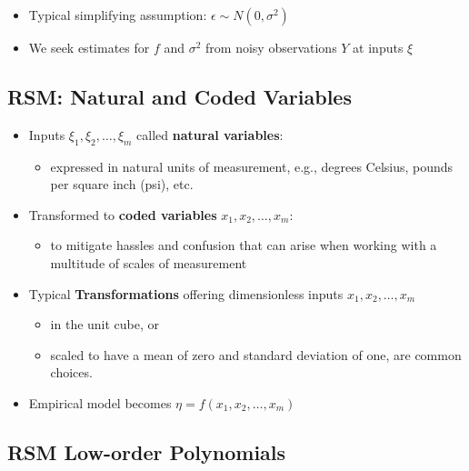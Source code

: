 \documentclass[
  letterpaper,
  DIV=11,
  numbers=noendperiod]{scrreprt}
\providecommand{\tightlist}{%
  \setlength{\itemsep}{0pt}\setlength{\parskip}{0pt}}\usepackage{longtable,booktabs,array}
\begin{document}
\begin{itemize}
\tightlist
\item
  Typical simplifying assumption: \(\epsilon \sim N(0,\sigma^2)\)
\item
  We seek estimates for \(f\) and \(\sigma^2\) from noisy observations
  \(Y\) at inputs \(\xi\)
\end{itemize}

\hypertarget{rsm-natural-and-coded-variables}{%
\subsection{RSM: Natural and Coded
Variables}\label{rsm-natural-and-coded-variables}}

\begin{itemize}
\tightlist
\item
  Inputs \(\xi_1, \xi_2, \ldots, \xi_m\) called \textbf{natural
  variables}:

  \begin{itemize}
  \tightlist
  \item
    expressed in natural units of measurement, e.g., degrees Celsius,
    pounds per square inch (psi), etc.
  \end{itemize}
\item
  Transformed to \textbf{coded variables} \(x_1, x_2, \ldots, x_m\):

  \begin{itemize}
  \tightlist
  \item
    to mitigate hassles and confusion that can arise when working with a
    multitude of scales of measurement
  \end{itemize}
\item
  Typical \textbf{Transformations} offering dimensionless inputs
  \(x_1, x_2, \ldots, x_m\)

  \begin{itemize}
  \tightlist
  \item
    in the unit cube, or
  \item
    scaled to have a mean of zero and standard deviation of one, are
    common choices.
  \end{itemize}
\item
  Empirical model becomes \(\eta = f(x_1, x_2, \ldots, x_m)\)
\end{itemize}

\hypertarget{rsm-low-order-polynomials}{%
\subsection{RSM Low-order Polynomials}\label{rsm-low-order-polynomials}}
\end{document}
